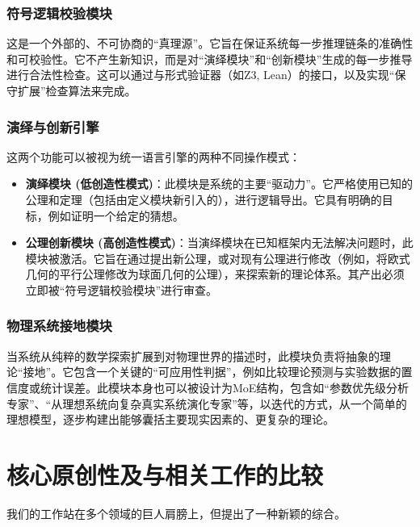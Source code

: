 \documentclass[11pt, a4paper]{article}
\begin{document}
\subsubsection{符号逻辑校验模块}
这是一个外部的、不可协商的“真理源”。它旨在保证系统每一步推理链条的准确性和可校验性。它不产生新知识，而是对“演绎模块”和“创新模块”生成的每一步推导进行合法性检查。这可以通过与形式验证器（如Z3, Lean）的接口，以及实现“保守扩展”检查算法来完成。

\subsubsection{演绎与创新引擎}
这两个功能可以被视为统一语言引擎的两种不同操作模式：
\begin{itemize}
	\item \textbf{演绎模块 (低创造性模式)}：此模块是系统的主要“驱动力”。它严格使用已知的公理和定理（包括由定义模块新引入的），进行逻辑导出。它具有明确的目标，例如证明一个给定的猜想。
	\item \textbf{公理创新模块 (高创造性模式)}：当演绎模块在已知框架内无法解决问题时，此模块被激活。它旨在通过提出新公理，或对现有公理进行修改（例如，将欧式几何的平行公理修改为球面几何的公理），来探索新的理论体系。其产出必须立即被“符号逻辑校验模块”进行审查。
\end{itemize}

\subsubsection{物理系统接地模块}
当系统从纯粹的数学探索扩展到对物理世界的描述时，此模块负责将抽象的理论“接地”。它包含一个关键的“可应用性判据”，例如比较理论预测与实验数据的置信度或统计误差。此模块本身也可以被设计为MoE结构，包含如“参数优先级分析专家”、“从理想系统向复杂真实系统演化专家”等，以迭代的方式，从一个简单的理想模型，逐步构建出能够囊括主要现实因素的、更复杂的理论。


\section{核心原创性及与相关工作的比较}

我们的工作站在多个领域的巨人肩膀上，但提出了一种新颖的综合。
\end{document}
